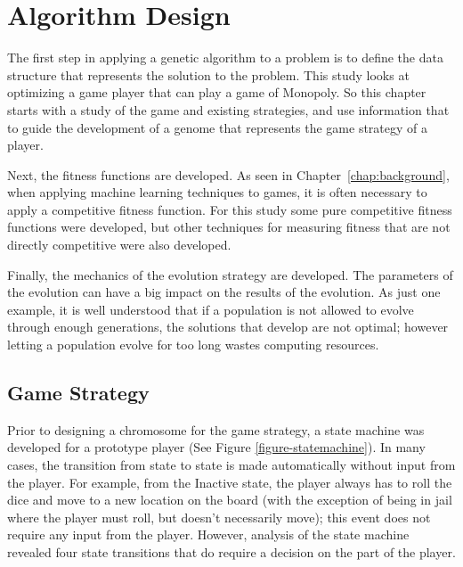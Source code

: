 \clearpage
\chapter{Algorithm Design} \label{chap:algorithm}

The first step in applying a genetic algorithm to a problem is to define the
data structure that represents the solution to the problem. This study looks at
optimizing a game player that can play a game of Monopoly. So this chapter
starts with a study of the game and existing strategies, and use information
that to guide the development of a genome that represents the game strategy of a
player.

Next, the fitness functions are developed. As seen in
Chapter~\ref{chap:background}, when applying machine learning techniques to
games, it is often necessary to apply a competitive fitness function. For this
study some pure competitive fitness functions were developed, but other
techniques for measuring fitness that are not directly competitive were also
developed.

Finally, the mechanics of the evolution strategy are developed. The parameters
of the evolution can have a big impact on the results of the evolution. As just
one example, it is well understood that if a population is not allowed to evolve
through enough generations, the solutions that develop are not optimal; however
letting a population evolve for too long wastes computing resources.

\section{Game Strategy} \label{5_strategy}

Prior to designing a chromosome for the game strategy, a state machine was
developed for a prototype player (See Figure \ref{figure-statemachine}). In many
cases, the transition from state to state is made automatically without input
from the player. For example, from the Inactive state, the player always has to
roll the dice and move to a new location on the board (with the exception of
being in jail where the player must roll, but doesn't necessarily move); this
event does not require any input from the player. However, analysis of the state
machine revealed four state transitions that do require a decision on the part
of the player.

